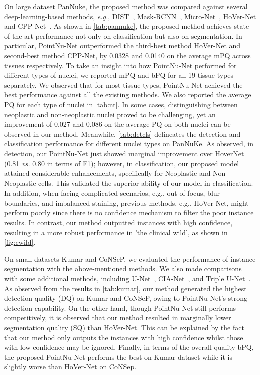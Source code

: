 \documentclass[lettersize,journal]{IEEEtran}
\newcommand{\eg}{{\textit{e.g.}}, }
\begin{document}
On large dataset PanNuke,  the proposed method was compared against several deep-learning-based methods, \eg DIST~\cite{dist}, Mask-RCNN~\cite{maskrcnn}, Micro-Net~\cite{micronet}, HoVer-Net\cite{hovernet} and CPP-Net~\cite{cppnet}. As shown in \autoref{tab:pannuke}, the proposed method achieves state-of-the-art performance not only on classification but also on segmentation. In particular, PointNu-Net outperformed the third-best method HoVer-Net and second-best method CPP-Net, by 0.0328 and 0.0140 on the average mPQ across tissues respectively. To take an insight into how PointNu-Net performed for different types of nuclei, we reported mPQ and bPQ for all 19 tissue types separately. We observed that for most tissue types, PointNu-Net achieved the best performance against all the existing methods. We also reported the average PQ for each type of nuclei in \autoref{tab:nt}. In some cases, distinguishing between neoplastic and non-neoplastic nuclei proved to be challenging, yet an improvement of 0.027 and 0.086 on the average PQ on both nuclei can be observed in our method. 
Meanwhile, \autoref{tab:detcls} delineates the detection and classification performance for different nuclei types on PanNuKe. As observed, in detection, our PointNu-Net just showed marginal improvement over HoverNet (0.81 \textit{vs.} 0.80 in terms of F1); however, in classification, our proposed model attained considerable enhancements, specifically for Neoplastic and Non-Neoplastic cells. This validated the superior  ability of our model in classification.
In addition, when facing complicated scenarios, e.g., out-of-focus, blur boundaries, and imbalanced staining, previous methods, e.g., HoVer-Net, might perform poorly since there is no confidence mechanism to filter the poor instance results. In contrast, our method outputted instances with high confidence, resulting in a more robust performance in 'the clinical wild', as shown in \autoref{fig:cwild}.

On small datasets Kumar and CoNSeP, we evaluated the performance of instance segmentation with the above-mentioned methods. We also made comparisons with some additional methods, including U-Net~\cite{unet}, CIA-Net~\cite{cianet}, and Triple U-Net~\cite{tripleunet}.  As observed from the results in \autoref{tab:kumar}, our method generated the highest detection quality (DQ) on Kumar and CoNSeP, owing to PointNu-Net's strong detection capability. On the other hand, though PointNu-Net still performs competitively, it is observed that our method resulted in marginally lower segmentation quality (SQ) than HoVer-Net. This can be explained by the fact that our method only outputs the instances with high confidence whilst those with low confidence may be ignored. Finally, in terms of the overall quality bPQ, the proposed PointNu-Net performs the best on Kumar dataset while it is slightly worse than  HoVer-Net on CoNSep.
\end{document}
